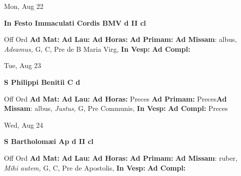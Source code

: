 \documentclass[10pt]{book}
\begin{document}
\begin{center}
\begin{minipage}{3.5in}
\vspace{2em}
\begin{center}Mon, Aug 22
\end{center}
\textbf{ \large In Festo Immaculati Cordis BMV
\textnormal{\normalsize d II cl}}

\begin{justify}Off Ord
\textbf{Ad Mat: }
\textbf{Ad Lau: }
\textbf{Ad Horas: }
\textbf{Ad Primam: }\textbf{Ad Missam}: albus, \textit{Adeamus,} G, C, Pre de B Maria Virg, 
\textbf{In Vesp: }
\textbf{Ad Compl: }
\end{justify}
\end{minipage}
\end{center}

\begin{center}
\begin{minipage}{3.5in}
\vspace{2em}
\begin{center}Tue, Aug 23
\end{center}
\textbf{ \large S Philippi Benitii C
\textnormal{\normalsize d}}

\begin{justify}Off Ord
\textbf{Ad Mat: }
\textbf{Ad Lau: }
\textbf{Ad Horas: }Preces
\textbf{Ad Primam: }Preces\textbf{Ad Missam}: albus, \textit{Justus,} G, Pre Communis, 
\textbf{In Vesp: }
\textbf{Ad Compl: }Preces
\end{justify}
\end{minipage}
\end{center}

\begin{center}
\begin{minipage}{3.5in}
\vspace{2em}
\begin{center}Wed, Aug 24
\end{center}
\textbf{ \large S Bartholomæi Ap
\textnormal{\normalsize d II cl}}

\begin{justify}Off Ord
\textbf{Ad Mat: }
\textbf{Ad Lau: }
\textbf{Ad Horas: }
\textbf{Ad Primam: }\textbf{Ad Missam}: ruber, \textit{Mihi autem,} G, C, Pre de Apostolis, 
\textbf{In Vesp: }
\textbf{Ad Compl: }
\end{justify}
\end{minipage}
\end{center}
\end{document}
